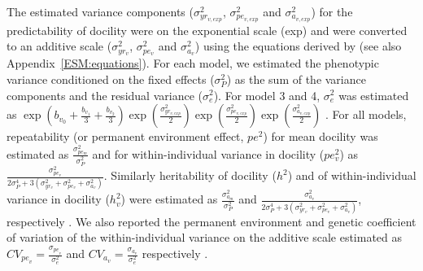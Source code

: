 \documentclass[a4paper,12pt,twoside]{article}
\begin{document}
	The estimated variance components ($\sigma_{yr_{v,exp}}^2$, $\sigma_{pe_{v,exp}}^2$ and $\sigma_{a_{v,exp}}^2$) for the predictability of docility were on the exponential scale (exp) and were converted to an additive scale ($\sigma_{yr_v}^2$, $\sigma_{pe_v}^2$ and $\sigma_{a_v}^2$) using the equations derived by \cite{Mulder2007} (see also Appendix~\ref{ESM:equations}).
	For each model, we estimated the phenotypic variance conditioned on the fixed effects ($\sigma_P^2$) as the sum of the variance components and the residual variance ($\sigma_e^2$).
	For model 3 and 4, $\sigma_e^2$ was estimated as $\exp \left( b_{v_0} + \frac{b_{v_1}}{3}+ \frac{b_{v_2}}{3} \right) \exp \left( \frac{\sigma_{yr_{v,exp}}^2}{2} \right) \exp \left( \frac{\sigma_{pe_{v,exp}}^2}{2} \right) \exp \left( \frac{\sigma_{a_{v,exp}}^2}{2} \right)$ \citep[Appendix~\ref{ESM:equations};][]{Felleki2012, Sae-lim2015}.
	For all models, repeatability (or permanent environment effect, $pe^2$) for mean docility was estimated as $\frac{\sigma_{pe_m}^2}{ \sigma_P^2 }$ and for within-individual variance in docility ($pe_v^2$) as $\frac{\sigma_{pe_v}^2}{2\sigma_P^4+3(\sigma_{yr_v}^2+ \sigma_{pe_v}^2 + \sigma_{a_v}^2)}$.
	Similarly heritability of docility ($h^2$) and of within-individual variance in docility ($h_v^2$) were estimated as $\frac{\sigma_{a_m}^2}{ \sigma_P^2 }$ and $\frac{\sigma_{a_v}^2}{2\sigma_P^4+3(\sigma_{yr_v}^2+ \sigma_{pe_v}^2 + \sigma_{a_v}^2)}$, respectively \citep[Appendix~\ref{ESM:equations};][]{Mulder2007}.
	We also reported the permanent environment and genetic coefficient of variation of the within-individual variance on the additive scale estimated as $CV_{{pe}_v} = \frac{\sigma_{{pe}_v}}{\sigma_e^2}$ and $CV_{a_v} = \frac{\sigma_{a_v}}{\sigma_e^2}$ respectively \citep{Hill2010}.

	
	
\end{document}
